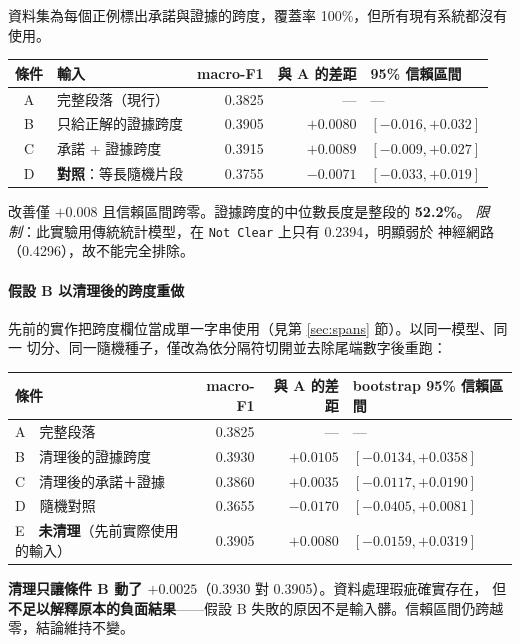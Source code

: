 \documentclass[11pt,a4paper]{ctexart}
\newcommand{\fn}[1]{\texttt{#1}}
\begin{document}
資料集為每個正例標出承諾與證據的跨度，覆蓋率 100\%，但所有現有系統都沒有使用。

\begin{table}[h]
\centering\small
\begin{tabular}{@{}clrrl@{}}
\toprule
條件 & 輸入 & macro-F1 & 與 A 的差距 & 95\% 信賴區間 \\
\midrule
A & 完整段落（現行）      & 0.3825 & --- & --- \\
B & 只給正解的證據跨度    & 0.3905 & $+0.0080$ & $[-0.016,+0.032]$ \\
C & 承諾 + 證據跨度       & 0.3915 & $+0.0089$ & $[-0.009,+0.027]$ \\
D & \textbf{對照}：等長隨機片段 & 0.3755 & $-0.0071$ & $[-0.033,+0.019]$ \\
\bottomrule
\end{tabular}
\end{table}

改善僅 $+0.008$ 且信賴區間跨零。證據跨度的中位數長度是整段的 \textbf{52.2\%}。
\textit{限制}：此實驗用傳統統計模型，在 \fn{Not Clear} 上只有 0.2394，明顯弱於
神經網路（0.4296），故不能完全排除。

\paragraph{假設 B 以清理後的跨度重做}
\label{sec:spanredo}

先前的實作把跨度欄位當成單一字串使用（見第 \ref{sec:spans} 節）。以同一模型、同一
切分、同一隨機種子，僅改為依分隔符切開並去除尾端數字後重跑：

\begin{table}[h]
\centering\small
\begin{tabular}{@{}lrrl@{}}
\toprule
條件 & macro-F1 & 與 A 的差距 & bootstrap 95\% 信賴區間 \\
\midrule
A\ \ 完整段落 & 0.3825 & --- & --- \\
B\ \ 清理後的證據跨度 & 0.3930 & $+0.0105$ & $[-0.0134, +0.0358]$ \\
C\ \ 清理後的承諾＋證據 & 0.3860 & $+0.0035$ & $[-0.0117, +0.0190]$ \\
D\ \ 隨機對照 & 0.3655 & $-0.0170$ & $[-0.0405, +0.0081]$ \\
E\ \ \textbf{未清理}（先前實際使用的輸入） & 0.3905 & $+0.0080$ & $[-0.0159, +0.0319]$ \\
\bottomrule
\end{tabular}
\end{table}

\textbf{清理只讓條件 B 動了 $+0.0025$}（0.3930 對 0.3905）。資料處理瑕疵確實存在，
但\textbf{不足以解釋原本的負面結果}——假設 B 失敗的原因不是輸入髒。信賴區間仍跨越
零，結論維持不變。
\end{document}
